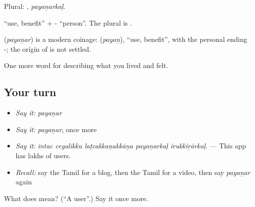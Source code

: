 Plural: , \emph{payaṉarkaḷ}.

 \textquotedblleft{}use, benefit\textquotedblright{} + - \textquotedblleft{}person\textquotedblright{}. The plural is .

\begin{cousinweb}
\textbf{} (\emph{payaṉar}) is a modern coinage:  (\emph{payaṉ}), \textquotedblleft{}use, benefit\textquotedblright{}, with the personal ending -; the origin of  is not settled.
\end{cousinweb}

\begin{grammarlens}[title={What you've built}]
One more word for describing what you lived and felt.
\end{grammarlens}

\subsection*{Your turn}
\begin{itemize}
\raggedright
  \item \emph{Say it:} \emph{payaṉar}
  \item \emph{Say it:} \emph{payaṉar}, once more
  \item \emph{Say it:} \emph{intac ceyalikku laṭcakkaṇakkāṉa payaṉarkaḷ irukkiṟārkaḷ.} — This app has lakhs of users.
  \item \emph{Recall:} say the Tamil for a blog, then the Tamil for a video, then say \emph{payaṉar} again
\end{itemize}

\begin{tcolorbox}[breakable,colback=teal!4,colframe=teal!35!black,title={Before you move on}]
What does  mean? (\textquotedblleft{}A user\textquotedblright{}.) Say it once more.
\end{tcolorbox}
